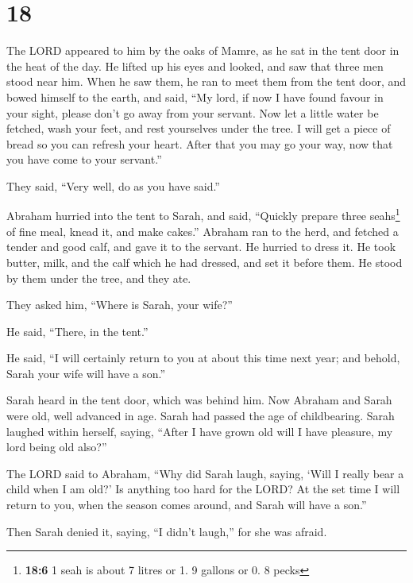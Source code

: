 \hypertarget{section-17}{%
\section{18}\label{section-17}}

 The LORD appeared to him by the oaks of Mamre, as he sat
in the tent door in the heat of the day.  He lifted up his
eyes and looked, and saw that three men stood near him. When he saw
them, he ran to meet them from the tent door, and bowed himself to the
earth,  and said, ``My lord, if now I have found favour in
your sight, please don't go away from your servant.  Now
let a little water be fetched, wash your feet, and rest yourselves under
the tree.  I will get a piece of bread so you can refresh
your heart. After that you may go your way, now that you have come to
your servant.''

They said, ``Very well, do as you have said.''

 Abraham hurried into the tent to Sarah, and said,
``Quickly prepare three seahs\footnote{\textbf{18:6} 1 seah is about 7
  litres or 1. 9 gallons or 0. 8 pecks} of fine meal, knead it, and make
cakes.''  Abraham ran to the herd, and fetched a tender
and good calf, and gave it to the servant. He hurried to dress it.
 He took butter, milk, and the calf which he had dressed,
and set it before them. He stood by them under the tree, and they ate.

 They asked him, ``Where is Sarah, your wife?''

He said, ``There, in the tent.''

 He said, ``I will certainly return to you at about this
time next year; and behold, Sarah your wife will have a son.''

Sarah heard in the tent door, which was behind him.  Now
Abraham and Sarah were old, well advanced in age. Sarah had passed the
age of childbearing.  Sarah laughed within herself,
saying, ``After I have grown old will I have pleasure, my lord being old
also?''

 The LORD said to Abraham, ``Why did Sarah laugh, saying,
`Will I really bear a child when I am old?'  Is anything
too hard for the LORD? At the set time I will return to you, when the
season comes around, and Sarah will have a son.''

 Then Sarah denied it, saying, ``I didn't laugh,'' for
she was afraid.

